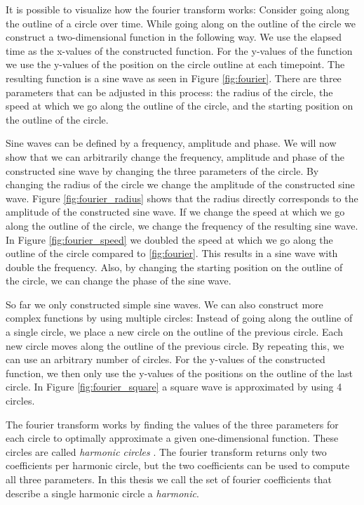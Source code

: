 \documentclass[thesis.tex]{subfiles}
\begin{document}
It is possible to visualize how the fourier transform works: Consider going along the outline of a circle over time. While going along on the outline of the circle we construct a two-dimensional function in the following way. We use the elapsed time as the x-values of the constructed function. For the y-values of the function we use the y-values of the position on the circle outline at each timepoint. The resulting function is a sine wave as seen in Figure \ref{fig:fourier}. There are three parameters that can be adjusted in this process: the radius of the circle, the speed at which we go along the outline of the circle, and the starting position on the outline of the circle.

Sine waves can be defined by a frequency, amplitude and phase. We will now show that we can arbitrarily change the frequency, amplitude and phase of the constructed sine wave by changing the three parameters of the circle. By changing the radius of the circle we change the amplitude of the constructed sine wave. Figure \ref{fig:fourier_radius} shows that the radius directly corresponds to the amplitude of the constructed sine wave. If we change the speed at which we go along the outline of the circle, we change the frequency of the resulting sine wave. In Figure \ref{fig:fourier_speed} we doubled the speed at which we go along the outline of the circle compared to \ref{fig:fourier}. This results in a sine wave with double the frequency. Also, by changing the starting position on the outline of the circle, we can change the phase of the sine wave.

So far we only constructed simple sine waves. We can also construct more complex functions by using multiple circles: Instead of going along the outline of a single circle, we place a new circle on the outline of the previous circle. Each new circle moves along the outline of the previous circle. By repeating this, we can use an arbitrary number of circles. For the y-values of the constructed function, we then only use the y-values of the positions on the outline of the last circle. In Figure \ref{fig:fourier_square} a square wave is approximated by using 4 circles. 

The fourier transform works by finding the values of the three parameters for each circle to optimally approximate a given one-dimensional function. These circles are called \textit{harmonic circles} \cite{snvastava2006nurbs}. The fourier transform returns only two coefficients per harmonic circle, but the two coefficients can be used to compute all three parameters. In this thesis we call the set of fourier coefficients that describe a single harmonic circle a \textit{harmonic}. 
\end{document}
